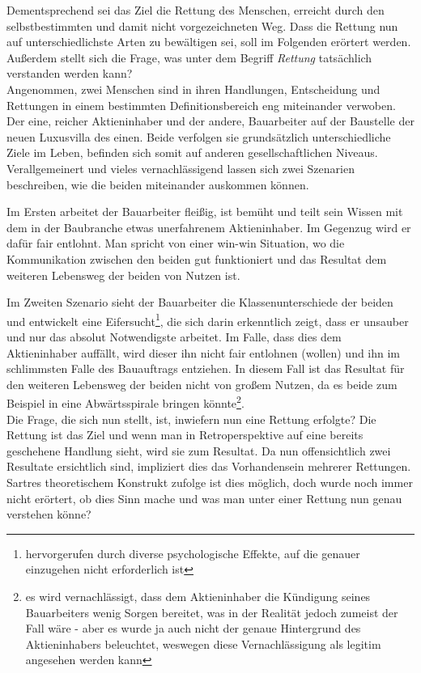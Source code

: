 \documentclass[12pt,a4paper,oneside]{article}
\begin{document}
  Dementsprechend sei das Ziel die Rettung des Menschen, erreicht durch den selbstbestimmten und damit nicht vorgezeichneten Weg. Dass die Rettung nun auf unterschiedlichste Arten zu bewältigen sei, soll im Folgenden erörtert werden. Außerdem stellt sich die Frage, was unter dem Begriff \textit{Rettung} tatsächlich verstanden werden kann? \\
  
  Angenommen, zwei Menschen sind in ihren Handlungen, Entscheidung und Rettungen in einem bestimmten Definitionsbereich eng miteinander verwoben. Der eine, reicher Aktieninhaber und der andere, Bauarbeiter auf der Baustelle der neuen Luxusvilla des einen. Beide verfolgen sie grundsätzlich unterschiedliche Ziele im Leben, befinden sich somit auf anderen gesellschaftlichen Niveaus. Verallgemeinert und vieles vernachlässigend lassen sich zwei Szenarien beschreiben, wie die beiden miteinander auskommen können. 
  
  Im Ersten arbeitet der Bauarbeiter fleißig, ist bemüht und teilt sein Wissen mit dem in der Baubranche etwas unerfahrenem Aktieninhaber. Im Gegenzug wird er dafür fair entlohnt. Man spricht von einer win-win Situation, wo die Kommunikation zwischen den beiden gut funktioniert und das Resultat dem weiteren Lebensweg der beiden von Nutzen ist. 
  
  Im Zweiten Szenario sieht der Bauarbeiter die Klassenunterschiede der beiden und entwickelt eine Eifersucht\footnote{hervorgerufen durch diverse psychologische Effekte, auf die genauer einzugehen nicht erforderlich ist}, die sich darin erkenntlich zeigt, dass er unsauber und nur das absolut Notwendigste arbeitet. Im Falle, dass dies dem Aktieninhaber auffällt, wird dieser ihn nicht fair entlohnen (wollen) und ihn im schlimmsten Falle des Bauauftrags entziehen. In diesem Fall ist das Resultat für den weiteren Lebensweg der beiden nicht von großem Nutzen, da es beide zum Beispiel in eine Abwärtsspirale bringen könnte\footnote{es wird vernachlässigt, dass dem Aktieninhaber die Kündigung seines Bauarbeiters wenig Sorgen bereitet, was in der Realität jedoch zumeist der Fall wäre - aber es wurde ja auch nicht der genaue Hintergrund des Aktieninhabers beleuchtet, weswegen diese Vernachlässigung als legitim angesehen werden kann}.\\
  
  Die Frage, die sich nun stellt, ist, inwiefern nun eine Rettung erfolgte? Die Rettung ist das Ziel und wenn man in Retroperspektive auf eine bereits geschehene Handlung sieht, wird sie zum Resultat. Da nun offensichtlich zwei Resultate ersichtlich sind, impliziert dies das Vorhandensein mehrerer Rettungen. Sartres theoretischem Konstrukt zufolge ist dies möglich, doch wurde noch immer nicht erörtert, ob dies Sinn mache und was man unter einer Rettung nun genau verstehen könne? \\
  
\end{document}
